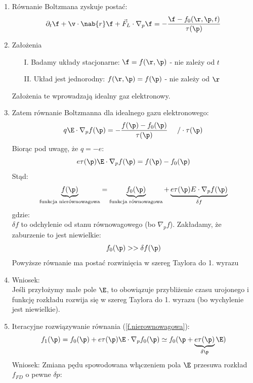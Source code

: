 \begin{enumerate}
\item Równanie Boltzmana zyskuje postać:
\begin{equation}\partial_t\f+\v\cdot\nab{r}\f+\vec{F}_L\cdot\nabla_p\f=-\frac{\f-f_0(\r,\p,t)}{\tau(\p)}\end{equation}
\item Założenia\\
\begin{itemize}
\item[I.] Badamy układy stacjonarne: $\f=f(\r,\p)$ - nie zależy od $t$
\item[II.] Układ jest jednorodny: $f(\r,\p)=f(\p)$ - nie zależy od $\r$
\end{itemize}
Założenia te wprowadzają idealny gaz elektronowy.
\item Zatem równanie Boltzmanna dla idealnego gazu elektronowego:
\begin{equation}q\E\cdot\nabla_{p}f(\p)=-\frac{f(\p)-f_0(\p)}{\tau(\p)}~~~~/\cdot\tau(\p)\end{equation}
Biorąc pod uwagę, że $q=-e$:
\begin{equation}e\tau(\p)\E\cdot\nabla_{p}f(\p)=f(\p)-f_0(\p)\end{equation}
Stąd:
\begin{equation}\underbrace{f(\p)}_{\text{funkcja nierównowagowa}} =\underbrace{f_0(\p)}_{\text{funkcja równowagowa}} +\underbrace{e\tau(\p)E\cdot\nabla_{p}f(\p)}_{\delta f}\label{f.nierownowagowa}\end{equation}
gdzie:\\
$\delta f$ to odchylenie od stanu równowagowego (bo $\nabla_{p}f$). Zakładamy, że zaburzenie to jest niewielkie:
\begin{equation}f_0(\p)>>\delta f(\p)\end{equation}
Powyższe równanie ma postać rozwinięcia w szereg Taylora do 1. wyrazu
\item Wniosek:\\
Jeśli przyłożymy małe pole $\E$, to obowiązuje przybliżenie czasu urojonego i funkcję rozkładu rozwija się w szereg Taylora do 1. wyrazu (bo wychylenie jest niewielkie).\\
\item Iteracyjne rozwiązywanie równania (\ref{f.nierownowagowa}):
\begin{equation}f_1(\p)=f_0(\p)+e\tau(\p)\E\cdot\nabla_{p}f_0(\p)
\simeq
f_0(\p+\underbrace{e\tau(\p)}_{\delta \p}\E) \end{equation}
Wniosek:
Zmiana pędu spowodowana włączeniem pola $\E$ przesuwa rozkład $f_{FD}$ o pewne $\delta p$:

\end{enumerate}
